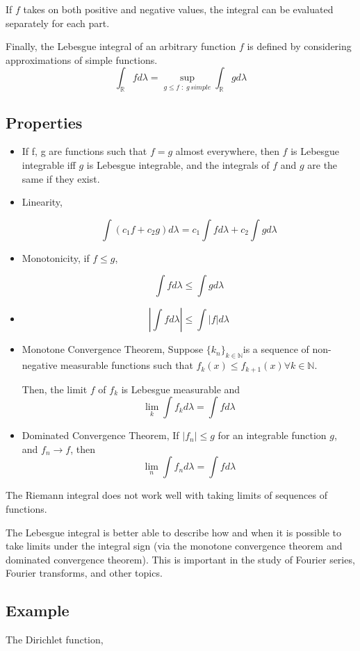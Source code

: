 \documentclass{article}
\begin{document}
If $f$ takes on both positive and negative values, the integral can be evaluated separately for each part.

Finally, the Lebesgue integral of an arbitrary function $f$ is defined by considering approximations of simple functions.
\[ \int_{\mathbb{R}} fd{\lambda}= \sup\limits_{g \leq f \;:\; g \,simple} \int_{\mathbb{R}} gd{\lambda}\]

\subsection{Properties}

\begin{itemize}
    \item     If f, g are functions such that $f = g$ almost everywhere, then $f$ is Lebesgue integrable iff $g$ is Lebesgue integrable, and the integrals of $f$ and $g$ are the same if they exist.
    \item Linearity,
    
    $$\int (c_1f+c_2g )d\lambda= c_1 \int f d\lambda+ c_2 \int g d\lambda$$
    \item Monotonicity, if $f\leq g$,
    
    $$\int f d\lambda \leq \int g d\lambda$$
    \item$$|{\int fd\lambda}| \leq \int |f|d\lambda$$ 
    \item Monotone Convergence Theorem, Suppose $\{ k_n\}_{k \in \mathbb{N}} $is a sequence of non-negative measurable functions such that
    $f_{k}(x) \leq f_{k+1}(x) \forall k \in \mathbb{N}.$
    
    Then, the limit $f$ of $f_k$ is Lebesgue measurable and
    \[ \lim_{k} \int f_k d\lambda = \int f d\lambda\]
    
    \item Dominated Convergence Theorem,  If $|f_n| \leq g$ for an integrable function $g$, and $f_n \to f$, then
    $$ \lim_{n}\int f_n d\lambda =\int f d\lambda$$
\end{itemize}
The Riemann integral does not work well with taking limits of sequences of functions. 

The Lebesgue integral is better able to describe how and when it is possible to take limits under the integral sign (via the monotone convergence theorem and dominated convergence theorem). This is important in the study of Fourier series, Fourier transforms, and other topics. 


\subsection{Example}
The Dirichlet function,
\end{document}
